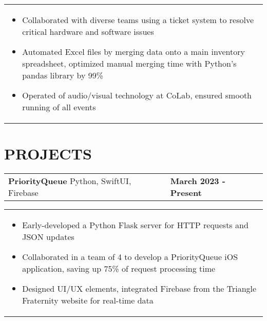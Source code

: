 \documentclass[10pt]{article}
\begin{document}
\vspace{-5pt}

\noindent \begin{tabularx}{\textwidth}{X}
\begin{itemize}[leftmargin=0.75cm, noitemsep, topsep=0pt, parsep=0pt, partopsep=0pt]
\item Collaborated with diverse teams using a ticket system to resolve critical hardware and software issues
\item Automated Excel files by merging data onto a main inventory spreadsheet, optimized manual merging time with Python's pandas library by 99\%
\item Operated of audio/visual technology at Co\textbar{}Lab, ensured smooth running of all events
\end{itemize}
\end{tabularx}




\section*{PROJECTS}

\noindent \begin{tabularx}{\textwidth}{X >{\raggedleft\arraybackslash}X}
\textbf{PriorityQueue} \textbar{} Python, SwiftUI, Firebase & \textbf{March 2023 - Present} \\
\end{tabularx}

\vspace{-5pt}

\noindent \begin{tabularx}{\textwidth}{X}
\begin{itemize}[leftmargin=0.75cm, noitemsep, topsep=0pt, parsep=0pt, partopsep=0pt]
\item Early-developed a Python Flask server for HTTP requests and JSON updates
\item Collaborated in a team of 4 to develop a PriorityQueue iOS application, saving up 75\% of request processing time
\item Designed UI/UX elements, integrated Firebase from the Triangle Fraternity website for real-time data
\end{itemize}
\end{tabularx}
\end{document}

